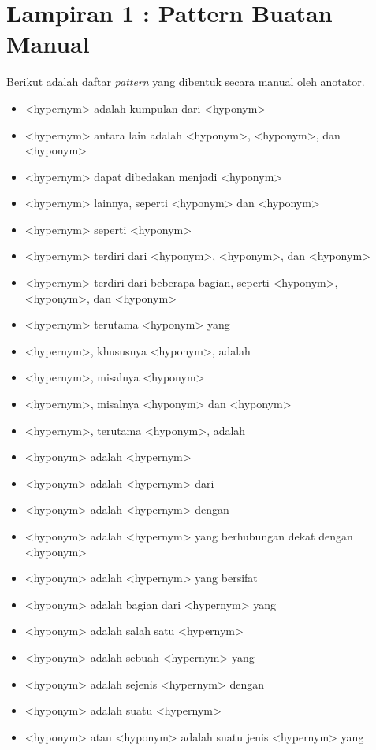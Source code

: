 \chapter*{Lampiran 1 : Pattern Buatan Manual}
Berikut adalah daftar \textit{pattern} yang dibentuk secara manual oleh anotator.
\begin{itemize}
  \item <hypernym> adalah kumpulan dari <hyponym>
  \item <hypernym> antara lain adalah <hyponym>, <hyponym>, dan <hyponym>
  \item <hypernym> dapat dibedakan menjadi <hyponym>
  \item <hypernym> lainnya, seperti <hyponym> dan <hyponym>
  \item <hypernym> seperti <hyponym>
  \item <hypernym> terdiri dari <hyponym>, <hyponym>, dan <hyponym>
  \item <hypernym> terdiri dari beberapa bagian, seperti <hyponym>, <hyponym>, dan <hyponym>
  \item <hypernym> terutama <hyponym> yang
  \item <hypernym>, khususnya <hyponym>, adalah
  \item <hypernym>, misalnya <hyponym>
  \item <hypernym>, misalnya <hyponym> dan <hyponym>
  \item <hypernym>, terutama <hyponym>, adalah
  \item <hyponym> adalah <hypernym>
  \item <hyponym> adalah <hypernym> dari
  \item <hyponym> adalah <hypernym> dengan
  \item <hyponym> adalah <hypernym> yang berhubungan dekat dengan <hyponym>
  \item <hyponym> adalah <hypernym> yang bersifat
  \item <hyponym> adalah bagian dari <hypernym> yang
  \item <hyponym> adalah salah satu <hypernym>
  \item <hyponym> adalah sebuah <hypernym> yang
  \item <hyponym> adalah sejenis <hypernym> dengan
  \item <hyponym> adalah suatu <hypernym>
  \item <hyponym> atau <hyponym> adalah suatu jenis <hypernym> yang

\end{itemize}

